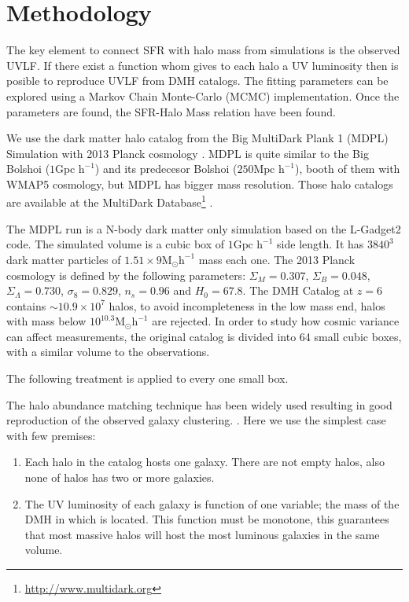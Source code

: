 \section{Methodology}

The key element to connect SFR with halo mass from simulations is the observed UVLF. 
If there exist a function whom gives to each halo a UV luminosity then is posible to 
reproduce UVLF from DMH catalogs. The fitting parameters can be explored using a 
Markov Chain Monte-Carlo (MCMC) implementation. Once the parameters are found, 
the SFR-Halo Mass relation have been found.

We use the dark matter halo catalog from the Big MultiDark Plank 1 (MDPL) Simulation 
\citep{klypin14} with 2013 Planck cosmology \citep{planck1}. MDPL is quite similar to the 
Big Bolshoi ($1 \textrm{Gpc h}^{-1}$) \citep{prada12} and 
its predecesor Bolshoi \citep{klypin11} ($250 \textrm{Mpc h}^{-1}$), booth of them with 
WMAP5 cosmology, but MDPL has bigger mass resolution.  Those halo catalogs are 
available at the MultiDark Database\footnote{\url{http://www.multidark.org}} 
\citep{riebe13}.

The MDPL run is a N-body dark matter only simulation based on the L-Gadget2 
code. The simulated volume is a cubic box of $1 \textrm{Gpc h}^{-1}$ side length. 
It has $3840^3$ dark matter particles of 
$1.51\times 9 \textrm{M}_{\odot} \textrm{h}^{-1}$ mass each one.
The 2013 Planck cosmology is defined by the following parameters: $\Sigma_M = 0.307$, 
$\Sigma_B = 0.048$, $\Sigma_\Lambda = 0.730$, $\sigma_8 = 0.829$, $n_s = 0.96$ and 
$H_0 = 67.8$. The DMH Catalog at $z=6$ contains $\sim 10.9 \times 10^7$ 
halos, to avoid incompleteness in the low mass end, halos with mass below 
$10^{10.3} \textrm{M}_{\odot} \textrm{h}^{-1}$ are rejected. In order to study how 
cosmic variance can affect measurements, the original catalog is divided into 64 small 
cubic boxes, with a similar volume to the observations.

The following treatment is applied to every one small box.

The halo abundance matching technique has been widely used \citep{colin99, kravtsov04}
resulting in good reproduction of the observed galaxy clustering. \citep{conroy06, lee09}. 
Here we use the simplest case with few premises: 
\begin{enumerate}
 \item Each halo in the catalog hosts one galaxy. There are not empty
halos, also none of halos has two or more galaxies.
 \item The UV luminosity of each galaxy is function of one variable; the mass of
the DMH in which is located. This function must be monotone, this guarantees that most massive halos will host the most luminous galaxies in the same volume.
\end{enumerate}

